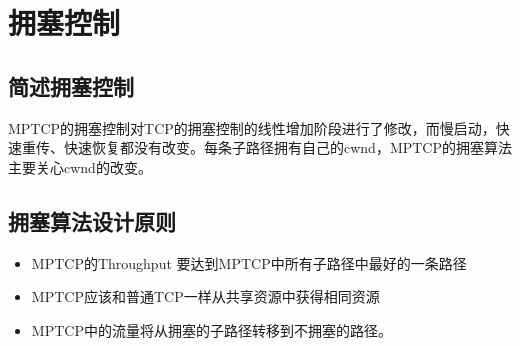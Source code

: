 \section{拥塞控制}
\subsection{简述拥塞控制}
MPTCP的拥塞控制对TCP的拥塞控制的线性增加阶段进行了修改，而慢启动，快速重传、快速恢复都没有改变。每条子路径拥有自己的cwnd，MPTCP的拥塞算法主要关心cwnd的改变。
\subsection{拥塞算法设计原则}
\begin{itemize}
  \item MPTCP的Throughput 要达到MPTCP中所有子路径中最好的一条路径
  \item MPTCP应该和普通TCP一样从共享资源中获得相同资源
  \item MPTCP中的流量将从拥塞的子路径转移到不拥塞的路径。
\end{itemize}
